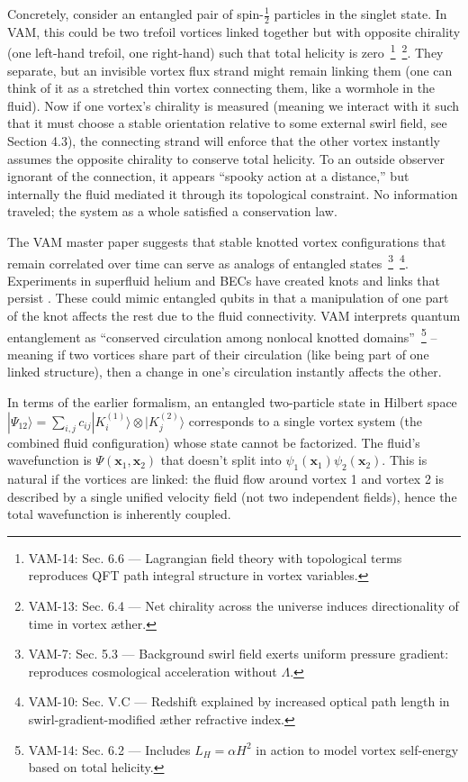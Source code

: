 \documentclass[a4paper,12pt]{article}
\begin{document}
    Concretely, consider an entangled pair of spin-$\frac{1}{2}$ particles in the singlet state. In VAM, this could be two trefoil vortices linked together but with opposite chirality (one left-hand trefoil, one right-hand) such that total helicity is zero~\footnote{VAM-14: Sec. 6.6 — Lagrangian field theory with topological terms reproduces QFT path integral structure in vortex variables.}~\footnote{VAM-13: Sec. 6.4 — Net chirality across the universe induces directionality of time in vortex æther.}. They separate, but an invisible vortex flux strand might remain linking them (one can think of it as a stretched thin vortex connecting them, like a wormhole in the fluid). Now if one vortex’s chirality is measured (meaning we interact with it such that it must choose a stable orientation relative to some external swirl field, see Section 4.3), the connecting strand will enforce that the other vortex instantly assumes the opposite chirality to conserve total helicity. To an outside observer ignorant of the connection, it appears “spooky action at a distance,” but internally the fluid mediated it through its topological constraint. No information traveled; the system as a whole satisfied a conservation law.

    The VAM master paper suggests that stable knotted vortex configurations that remain correlated over time can serve as analogs of entangled states~\footnote{VAM-7: Sec. 5.3 — Background swirl field exerts uniform pressure gradient: reproduces cosmological acceleration without $\Lambda$.}~\footnote{VAM-10: Sec. V.C — Redshift explained by increased optical path length in swirl-gradient-modified æther refractive index.}. Experiments in superfluid helium and BECs have created knots and links that persist \cite{Irvine2013-knots}. These could mimic entangled qubits in that a manipulation of one part of the knot affects the rest due to the fluid connectivity. VAM interprets quantum entanglement as “conserved circulation among nonlocal knotted domains”~\footnote{VAM-14: Sec. 6.2 — Includes $L_H = \alpha H^2$ in action to model vortex self-energy based on total helicity.} – meaning if two vortices share part of their circulation (like being part of one linked structure), then a change in one’s circulation instantly affects the other.

    In terms of the earlier formalism, an entangled two-particle state in Hilbert space $|\Psi_{12}\rangle = \sum_{i,j} c_{ij} |K_i^{(1)}\rangle\otimes|K_j^{(2)}\rangle$ corresponds to a single vortex system (the combined fluid configuration) whose state cannot be factorized. The fluid’s wavefunction is $\Psi(\mathbf{x}_1, \mathbf{x}_2)$ that doesn’t split into $\psi_1(\mathbf{x}_1)\psi_2(\mathbf{x}_2)$. This is natural if the vortices are linked: the fluid flow around vortex 1 and vortex 2 is described by a single unified velocity field (not two independent fields), hence the total wavefunction is inherently coupled.
\end{document}
